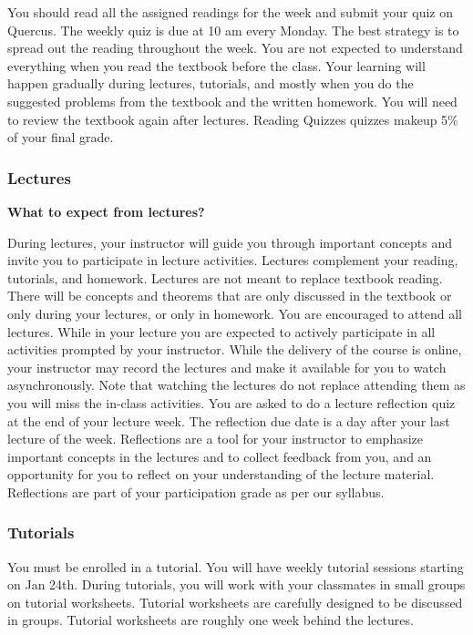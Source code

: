 \documentclass[11pt,fleqn]{book} %
\begin{document}
You should read all the assigned readings for the week and submit your quiz on Quercus. {\color{red}The weekly quiz is due at 10 am every Monday.} The best strategy is to spread out the reading throughout the week. You are not expected to understand everything when you read the textbook before the class. Your learning will happen gradually during lectures, tutorials, and mostly when you do the suggested problems from the textbook and the written homework.  You will need to review the textbook again after lectures. Reading Quizzes quizzes makeup 5\% of your final grade.

\subsubsection{Lectures}

\textbf{What to expect from lectures?}

 During lectures, your instructor will guide you through important concepts and invite you to participate in lecture activities. Lectures complement your reading, tutorials, and homework. Lectures are not meant to replace textbook reading. There will be concepts and theorems that are only discussed in the textbook or only during your lectures, or only in homework. You are encouraged to attend all lectures. While in your lecture you are expected to actively participate in all activities prompted by your instructor. While the delivery of the course is online, your instructor may record the lectures and make it available for you to watch asynchronously. Note that watching the lectures do not replace attending them as you will miss the in-class activities. You are asked to do a lecture reflection quiz at the end of your lecture week. The reflection due date is a day after your last lecture of the week. Reflections are a tool for your instructor to emphasize important concepts in the lectures and to collect feedback from you, and an opportunity for you to reflect on your understanding of the lecture material. Reflections are part of your participation grade as per our syllabus.

\subsubsection{Tutorials}

You must be enrolled in a tutorial.  You will have weekly tutorial sessions starting on Jan 24th. During tutorials, you will work with your classmates in small groups on tutorial worksheets.  Tutorial worksheets are carefully designed to be discussed in groups. Tutorial worksheets are roughly one week behind the lectures.
\end{document}
